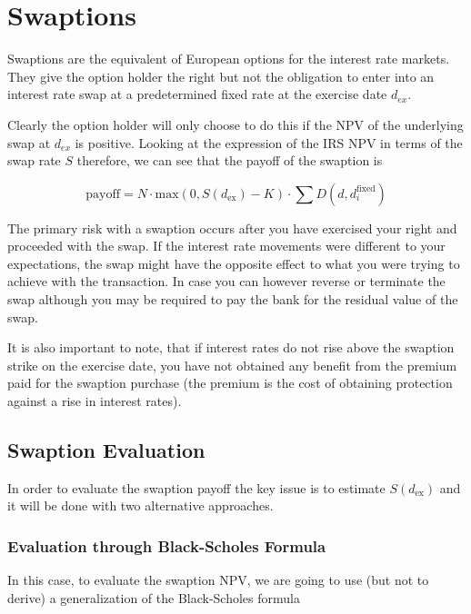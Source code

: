 \section{Swaptions}
\label{interest-rate-swaptions}

Swaptions are the equivalent of European options for the interest rate markets. They give the option holder the right but not the obligation to enter into an interest rate swap at a predetermined fixed rate at the exercise date $d_{ex}$.

Clearly the option holder will only choose to do this if the NPV of the underlying swap at $d_{ex}$ is positive. Looking at the expression of the IRS NPV in terms of the swap rate $S$ therefore, we can see that the payoff of the swaption is

\begin{equation}
\mathrm{payoff} = N\cdot \mathrm{max}(0, S(d_{\mathrm{ex}}) - K)\cdot\sum D(d, d_i^{\mathrm{fixed}})
\label{eq:swaption_payoff}
\end{equation}

The primary risk with a swaption occurs after you have exercised your right and proceeded with the swap. If the interest rate movements were different to your expectations, the swap might have the opposite effect to what you were trying to achieve with the transaction. In case you can however reverse or terminate the swap although you may be required to pay the bank for the residual value of the swap.

It is also important to note, that if interest rates do not rise above the swaption strike on the exercise date, you have not obtained any benefit from the premium paid for the swaption purchase (the premium is the cost of obtaining protection against a rise in interest rates).

\subsection{Swaption Evaluation}

In order to evaluate the swaption payoff the key issue is to estimate $S(d_{\mathrm{ex}})$ and it will be done with two alternative approaches.

\subsubsection{Evaluation through Black-Scholes Formula}
\label{evaluation-through-black-scholes-formula}

In this case, to evaluate the swaption NPV, we are going to use (but not to derive) a generalization of the Black-Scholes formula


